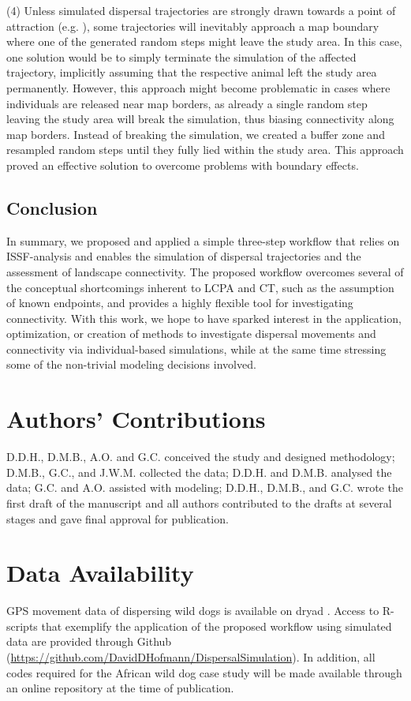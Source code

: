 \documentclass[abstract=on,10pt,a4paper,bibliography=totocnumbered]{article}
\begin{document}
(4) Unless simulated dispersal trajectories are strongly drawn towards a point
of attraction (e.g. \cite{Signer.2017}), some trajectories will inevitably
approach a map boundary where one of the generated random steps might leave the
study area. In this case, one solution would be to simply terminate the
simulation of the affected trajectory, implicitly assuming that the respective
animal left the study area permanently. However, this approach might become
problematic in cases where individuals are released near map borders, as already
a single random step leaving the study area will break the simulation, thus
biasing connectivity along map borders. Instead of breaking the simulation, we
created a buffer zone \citep{Koen.2010} and resampled random steps until they
fully lied within the study area. This approach proved an effective solution to
overcome problems with boundary effects.

\subsection{Conclusion}
In summary, we proposed and applied a simple three-step workflow that relies on
ISSF-analysis and enables the simulation of dispersal trajectories and the
assessment of landscape connectivity. The proposed workflow overcomes several of
the conceptual shortcomings inherent to LCPA and CT, such as the assumption of
known endpoints, and provides a highly flexible tool for investigating
connectivity. With this work, we hope to have sparked interest in the
application, optimization, or creation of methods to investigate dispersal
movements and connectivity via individual-based simulations, while at the same
time stressing some of the non-trivial modeling decisions involved.

\section{Authors' Contributions}
D.D.H., D.M.B., A.O. and G.C. conceived the study and designed methodology;
D.M.B., G.C., and J.W.M. collected the data; D.D.H. and D.M.B. analysed the
data; G.C. and A.O. assisted with modeling; D.D.H., D.M.B., and G.C. wrote the
first draft of the manuscript and all authors contributed to the drafts at
several stages and gave final approval for publication.

\section{Data Availability}
GPS movement data of dispersing wild dogs is available on dryad
\citep{Hofmann.2021b}. Access to R-scripts that exemplify the application of the
proposed workflow using simulated data are provided through Github
(\url{https://github.com/DavidDHofmann/DispersalSimulation}). In addition, all
codes required for the African wild dog case study will be made available
through an online repository at the time of publication.
\end{document}

